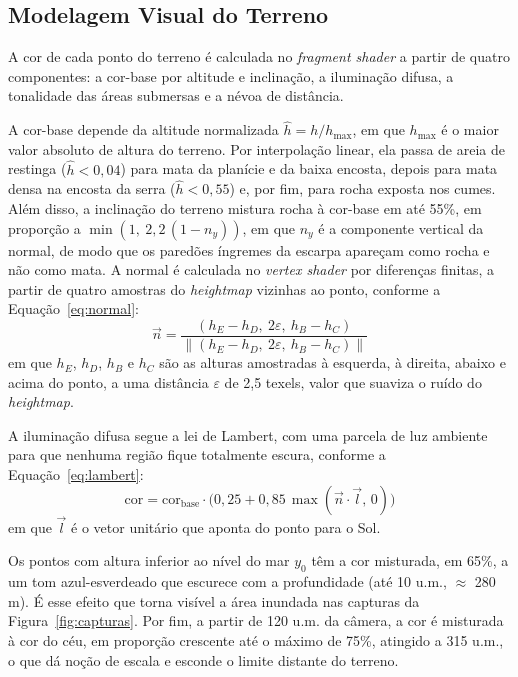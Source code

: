 \documentclass[conference]{IEEEtran}
\begin{document}
\subsection{Modelagem Visual do Terreno}
\label{sub:visual}

A cor de cada ponto do terreno é calculada no \emph{fragment shader} a
partir de quatro componentes: a cor-base por altitude e inclinação, a
iluminação difusa, a tonalidade das áreas submersas e a névoa de distância.

A cor-base depende da altitude normalizada $\hat{h} = h / h_{\max}$, em que
$h_{\max}$ é o maior valor absoluto de altura do terreno. Por interpolação linear, ela passa de
areia de restinga ($\hat{h} < 0{,}04$) para mata da planície e da baixa
encosta, depois para mata densa na encosta da serra ($\hat{h} < 0{,}55$) e,
por fim, para rocha exposta nos cumes. Além disso, a inclinação do terreno
mistura rocha à cor-base em até 55\%, em proporção a
$\min(1,\ 2{,}2\,(1 - n_y))$, em que $n_y$ é a componente vertical da normal, de modo que os paredões íngremes da
escarpa apareçam como rocha e não como mata. A normal é calculada no
\emph{vertex shader} por diferenças finitas, a partir de quatro amostras do
\emph{heightmap} vizinhas ao ponto, conforme a Equação~\eqref{eq:normal}:
\begin{equation}
\vec{n} = \frac{(h_E - h_D,\ 2\varepsilon,\ h_B - h_C)}{\left\lVert (h_E - h_D,\ 2\varepsilon,\ h_B - h_C) \right\rVert}
\label{eq:normal}
\end{equation}
em que $h_E$, $h_D$, $h_B$ e $h_C$ são as alturas amostradas à esquerda, à
direita, abaixo e acima do ponto, a uma distância $\varepsilon$ de 2,5 texels,
valor que suaviza o ruído do \emph{heightmap}.

A iluminação difusa segue a lei de Lambert, com uma parcela de luz ambiente
para que nenhuma região fique totalmente escura, conforme a
Equação~\eqref{eq:lambert}:
\begin{equation}
\text{cor} = \text{cor}_{\text{base}} \cdot \big(0{,}25 + 0{,}85\,\max(\vec{n} \cdot \vec{l},\, 0)\big)
\label{eq:lambert}
\end{equation}
em que $\vec{l}$ é o vetor unitário que aponta do ponto para o Sol.

Os pontos com altura inferior ao nível do mar $y_0$ têm a cor misturada, em
65\%, a um tom azul-esverdeado que escurece com a profundidade (até 10 u.m., $\approx$ 280 m). É esse
efeito que torna visível a área inundada nas capturas da
Figura~\ref{fig:capturas}. Por fim, a partir de 120 u.m. da câmera, a cor é
misturada à cor do céu, em proporção crescente até o máximo de 75\%,
atingido a 315 u.m., o que
dá noção de escala e esconde o limite distante do terreno.
\end{document}
